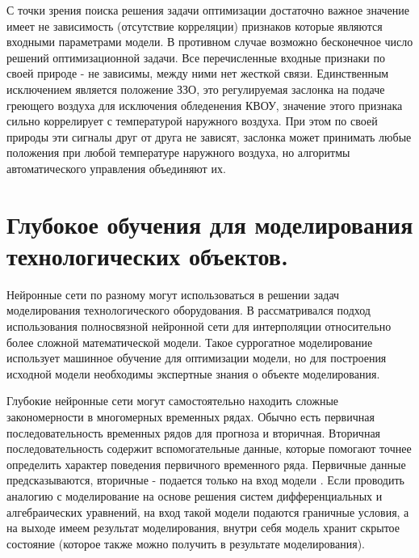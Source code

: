 \documentclass[12pt,a4paper]{article}
\begin{document}
С точки зрения поиска решения задачи оптимизации достаточно важное значение имеет не зависимость (отсутствие корреляции) признаков которые являются входными параметрами модели. В противном случае возможно бесконечное число решений оптимизационной задачи. Все перечисленные входные признаки по своей природе - не зависимы, между ними нет жесткой связи. Единственным исключением является положение ЗЗО, это регулируемая заслонка на подаче греющего воздуха для исключения обледенения КВОУ, значение этого признака сильно коррелирует с температурой наружного воздуха. При этом по своей природы эти сигналы друг от друга не зависят, заслонка может принимать любые положения при любой температуре наружного воздуха, но алгоритмы автоматического управления объединяют их.

\section{Глубокое обучения для моделирования технологических объектов.}

Нейронные сети по разному могут использоваться в решении задач моделирования технологического оборудования. В \cite{Shabunin} рассматривался подход использования полносвязной нейронной сети для интерполяции относительно более сложной математической модели. Такое суррогатное моделирование использует машинное обучение для оптимизации модели, но для построения исходной модели необходимы экспертные знания о объекте моделирования.    


Глубокие нейронные сети могут самостоятельно находить сложные закономерности в многомерных временных рядах. Обычно есть первичная последовательность временных рядов для прогноза и вторичная. Вторичная последовательность содержит вспомогательные данные, которые помогают точнее определить характер поведения первичного временного ряда. Первичные данные предсказываются, вторичные - подается только на вход модели \cite{Gribin}. Если проводить аналогию с моделирование на основе решения систем дифференциальных и алгебраических уравнений, на вход такой модели подаются граничные условия, а на выходе имеем результат моделирования, внутри себя модель хранит скрытое состояние (которое также можно получить в результате моделирования).
\end{document}

